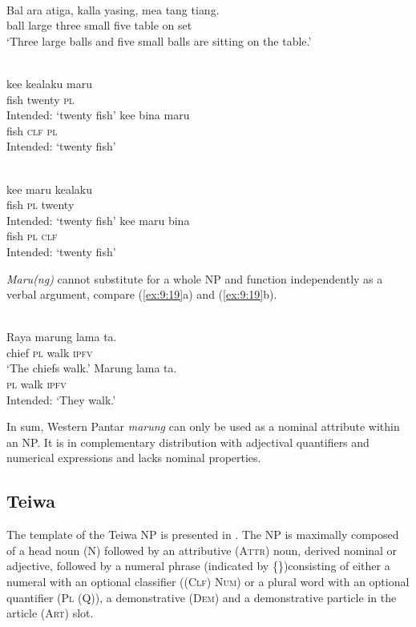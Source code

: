 \ea %
\label{bkm:Ref334530759}
 \\
\gll Bal ara atiga, kalla yasing, mea tang {ti}{{\textglotstop}}{ang.} \\
 ball large three small five table on  set \\
\glt `Three large balls and five small balls are sitting on the table.'
\z



\ea%
\label{ex:9:17}
 \\
\ea
\gll *ke{\textglotstop}e kealaku maru \\
   fish  twenty \textsc{pl} \\
\glt Intended: \textsc{`}twenty fish'
\ex
\gll *ke{\textglotstop}e bina maru \\
 fish \textsc{clf} \textsc{pl} \\
\glt Intended: `twenty fish'
\z
\z


\ea%
\label{ex:9:18}
 \\
\ea
\gll *ke{\textglotstop}e  maru kealaku \\
   fish  \textsc{pl} twenty \\
\glt Intended: `twenty fish'
\ex 
\gll *ke{\textglotstop}e maru  bina \\
 fish \textsc{pl} \textsc{clf} \\
 \glt Intended: `twenty fish'
\z
\z

\textit{Maru(ng)} cannot substitute for a whole NP and function independently as a verbal argument, compare (\ref{ex:9:19}a) and (\ref{ex:9:19}b).


\ea%
\label{ex:9:19}
 \\
\ea
\gll  Raya marung lama ta. \\
   chief \textsc{pl} walk \textsc{ipfv}  \\
\glt `The chiefs walk.'
\ex
\gll *Marung lama ta. \\
  \textsc{pl} walk \textsc{ipfv}  \\
\glt Intended: `They walk.'
\z
\z


 In sum, Western Pantar \textit{marung} can only be used as a nominal attribute within an NP. It is in complementary distribution with adjectival quantifiers and numerical expressions and lacks nominal properties.

\subsection{Teiwa} %
\label{sec:9:3.2}
The template of the Teiwa NP is presented in . The NP is maximally composed of a head noun (N) followed by an attributive (\textsc{Attr)} noun, derived nominal or adjective\textsc{,} followed by a numeral phrase (indicated by \{\})consisting of either a numeral with an optional classifier (\textsc{(Clf)} \textsc{Num)} or a plural word with an optional quantifier (\textsc{Pl} \textsc{(Q)),} a demonstrative \textsc{(Dem)} and a demonstrative particle in the article (\textsc{Art)} slot.

